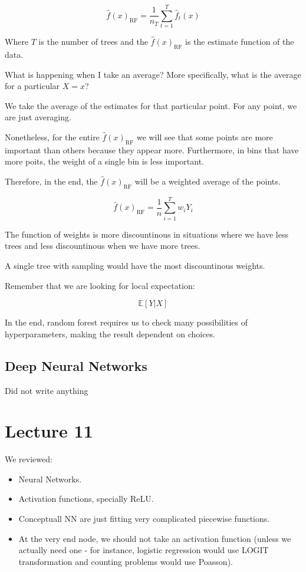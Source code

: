 \documentclass{article}
\begin{document}
$$
\hat{f}(x)_{\text{RF}} = \frac{1}{n_T} \sum_{t=1}^{T} \hat{f}_t(x)
$$

Where $T$ is the number of trees and the $\hat{f}(x)_{\text{RF}}$ is the estimate function of the data.

What is happening when I take an average? More specifically, what is the average for a particular $X = x$?

We take the average of the estimates for that particular point. For any point, we are just averaging.

Nonetheless, for the entire $\hat{f}(x)_{\text{RF}}$ we will see that some points are more important than others because they appear more. Furthermore, in bins that have more poits, the weight of a single bin is less important.

Therefore, in the end, the $\hat{f}(x)_{\text{RF}}$ will be a weighted average of the points.

$$
\hat{f}(x)_{\text{RF}} = \frac{1}{n} \sum_{i = 1}^{T} w_i Y_i
$$

The function of weights is more discountinous in situations where we have less trees and less discountinous when we have more trees.

A single tree with sampling would have the most discountinous weights.

Remember that we are looking for local expectation:

$$
\mathbb{E}[Y | X]
$$

In the end, random forest requires us to check many possibilities of hyperparameters, making the result dependent on choices.

\subsection{Deep Neural Networks}

Did not write anything

\section{Lecture 11}

We reviewed:
\begin{itemize}
    \item Neural Networks.
    \item Activation functions, specially ReLU.
    \item Conceptuall NN are just fitting very complicated piecewise functions.
    \item At the very end node, we should not take an activation function (unless we actually need one - for instance, logistic regression would use LOGIT transformation and counting problems would use Poasson).
\end{itemize}
\end{document}
